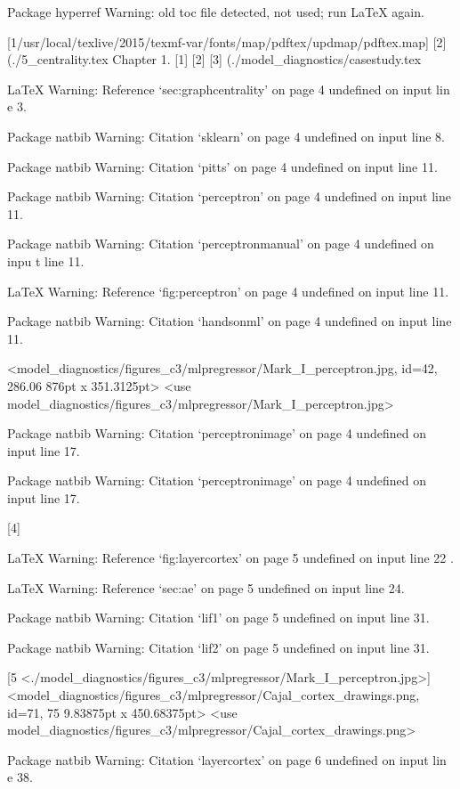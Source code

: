 Package hyperref Warning: old toc file detected, not used; run LaTeX again.

[1{/usr/local/texlive/2015/texmf-var/fonts/map/pdftex/updmap/pdftex.map}]
[2] (./5_centrality.tex
Chapter 1.
[1] [2] [3] (./model_diagnostics/casestudy.tex

LaTeX Warning: Reference `sec:graphcentrality' on page 4 undefined on input lin
e 3.


Package natbib Warning: Citation `sklearn' on page 4 undefined on input line 8.



Package natbib Warning: Citation `pitts' on page 4 undefined on input line 11.


Package natbib Warning: Citation `perceptron' on page 4 undefined on input line
 11.


Package natbib Warning: Citation `perceptronmanual' on page 4 undefined on inpu
t line 11.


LaTeX Warning: Reference `fig:perceptron' on page 4 undefined on input line 11.



Package natbib Warning: Citation `handsonml' on page 4 undefined on input line 
11.


<model_diagnostics/figures_c3/mlpregressor/Mark_I_perceptron.jpg, id=42, 286.06
876pt x 351.3125pt>
<use model_diagnostics/figures_c3/mlpregressor/Mark_I_perceptron.jpg>

Package natbib Warning: Citation `perceptronimage' on page 4 undefined on input
 line 17.


Package natbib Warning: Citation `perceptronimage' on page 4 undefined on input
 line 17.

[4]

LaTeX Warning: Reference `fig:layercortex' on page 5 undefined on input line 22
.


LaTeX Warning: Reference `sec:ae' on page 5 undefined on input line 24.


Package natbib Warning: Citation `lif1' on page 5 undefined on input line 31.


Package natbib Warning: Citation `lif2' on page 5 undefined on input line 31.

[5 <./model_diagnostics/figures_c3/mlpregressor/Mark_I_perceptron.jpg>]
<model_diagnostics/figures_c3/mlpregressor/Cajal_cortex_drawings.png, id=71, 75
9.83875pt x 450.68375pt>
<use model_diagnostics/figures_c3/mlpregressor/Cajal_cortex_drawings.png>

Package natbib Warning: Citation `layercortex' on page 6 undefined on input lin
e 38.


